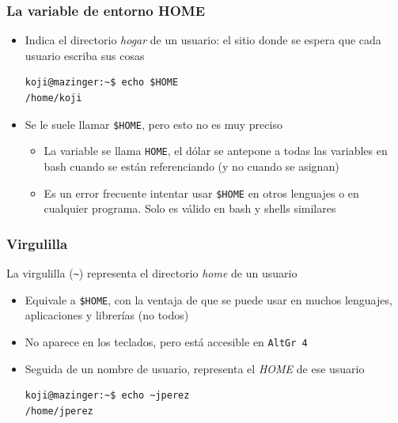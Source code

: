 \documentclass[ucs]{beamer}
\begin{document}
\begin{frame}[fragile]
\frametitle{La variable de entorno HOME}
\begin{itemize}
\item
Indica el directorio \emph{hogar} de un usuario: el sitio donde se espera
que cada usuario escriba sus cosas
\begin{footnotesize}
\begin{verbatim}
koji@mazinger:~$ echo $HOME
/home/koji
\end{verbatim}
\end{footnotesize}
\item
Se le suele llamar \verb|$HOME|, pero esto no es muy preciso
\begin{itemize}
\item La variable se llama \verb|HOME|, el dólar se antepone a todas
las variables en bash cuando se están referenciando (y no cuando se asignan)
\item Es un error frecuente intentar usar \verb|$HOME| en otros lenguajes
o en cualquier programa. Solo es válido en bash y shells similares
\end{itemize}
\end{itemize}

\end{frame}



\begin{frame}[fragile]
\frametitle{Virgulilla}
La virgulilla (\verb|~|) representa el directorio \emph{home} de un usuario
\begin{itemize}
\item
Equivale a \verb|$HOME|, con la ventaja de que se puede usar en
muchos lenguajes, aplicaciones y librerías (no todos)
\item
No aparece en los teclados, pero está accesible en \verb|AltGr 4|
\item
Seguida de un nombre de usuario, representa el \emph{HOME} de ese usuario
\begin{footnotesize}
\begin{verbatim}
koji@mazinger:~$ echo ~jperez
/home/jperez
\end{verbatim}
\end{footnotesize}

\end{itemize}

\end{frame}
\end{document}
